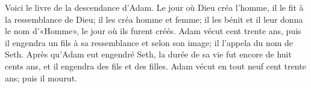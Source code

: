 Voici le livre de la descendance d’Adam.
Le jour où Dieu créa l’homme, il le fit à la ressemblance de Dieu;
	il les créa homme et femme;
	il les bénit et il leur donna le nom d’«Homme»,
	le jour où ils furent créés.
Adam vécut cent trente ans,
	puis il engendra un fils à sa ressemblance et selon son image;
	il l’appela du nom de Seth.
Après qu’Adam eut engendré Seth,
	la durée de sa vie fut encore de huit cents ans,
	et il engendra des fils et des filles.
Adam vécut en tout neuf cent trente ans; puis il mourut.
